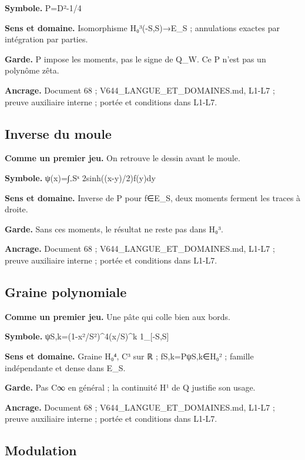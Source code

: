 \documentclass[
  9pt,
  a4paper,
]{article}
\begin{document}
\textbf{Symbole.} P=D²-1/4

\textbf{Sens et domaine.} Isomorphisme H₀³(-S,S)→E\_S ; annulations
exactes par intégration par parties.

\textbf{Garde.} P impose les moments, pas le signe de Q\_W. Ce P n'est
pas un polynôme zêta.

\textbf{Ancrage.} Document 68 ; V644\_LANGUE\_ET\_DOMAINES.md, L1-L7 ;
preuve auxiliaire interne ; portée et conditions dans L1-L7.

\hypertarget{inverse-du-moule}{%
\subsection{Inverse du moule}\label{inverse-du-moule}}

\textbf{Comme un premier jeu.} On retrouve le dessin avant le moule.

\textbf{Symbole.} ψ(x)=∫₋Sˣ 2sinh((x-y)/2)f(y)dy

\textbf{Sens et domaine.} Inverse de P pour f∈E\_S, deux moments ferment
les traces à droite.

\textbf{Garde.} Sans ces moments, le résultat ne reste pas dans H₀³.

\textbf{Ancrage.} Document 68 ; V644\_LANGUE\_ET\_DOMAINES.md, L1-L7 ;
preuve auxiliaire interne ; portée et conditions dans L1-L7.

\hypertarget{graine-polynomiale}{%
\subsection{Graine polynomiale}\label{graine-polynomiale}}

\textbf{Comme un premier jeu.} Une pâte qui colle bien aux bords.

\textbf{Symbole.} ψS,k=(1-x²/S²)\^{}4(x/S)\^{}k 1\_{[}-S,S{]}

\textbf{Sens et domaine.} Graine H₀⁴, C³ sur ℝ ; fS,k=PψS,k∈H₀² ;
famille indépendante et dense dans E\_S.

\textbf{Garde.} Pas C∞ en général ; la continuité H¹ de Q justifie son
usage.

\textbf{Ancrage.} Document 68 ; V644\_LANGUE\_ET\_DOMAINES.md, L1-L7 ;
preuve auxiliaire interne ; portée et conditions dans L1-L7.

\hypertarget{modulation}{%
\subsection{Modulation}\label{modulation}}
\end{document}
